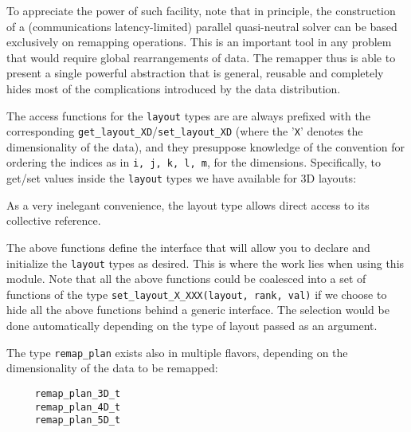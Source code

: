 \documentclass[]{report}   %
\begin{document}
To appreciate the power of such facility, note that in principle, the construction of a (communications latency-limited) parallel quasi-neutral solver can be based exclusively on remapping operations. This is an important tool in any problem that would require global rearrangements of data. The remapper thus is able to present a single powerful abstraction that is general, reusable and completely hides most of the complications introduced by the data distribution. 

\begin{comment}
Each of these boxes is simply described by several pairs of limits:
\begin{verbatim}
[i_min, i_max], [j_min, j_max], [k_min, k_max], [l_min, l_max],
\end{verbatim}    
(and for a 5D case, also \verb+[m_min, m_max]+) that describe the indices of the $4D$ data contained in each processor.  
\end{comment}








The access functions for the \verb+layout+ types are are always prefixed with the corresponding \verb+get_layout_XD+/\verb+set_layout_XD+ (where the '\verb+X+' denotes the dimensionality of the data), and they presuppose knowledge of the convention for ordering the indices as in \verb+i, j, k, l, m+, for the dimensions. Specifically, to get/set values inside the \verb+layout+ types we have available for 3D layouts:

As a very inelegant convenience, the layout type allows direct access to its collective reference.     

The above functions define the interface that will allow you to declare and initialize the \verb+layout+ types as desired. This is where the work lies when using this module. Note that all the above functions could be coalesced into a set of functions of the type \verb+set_layout_X_XXX(layout, rank, val)+ if we choose to hide all the above functions behind a generic interface. The selection would be done automatically depending on the type of layout passed as an argument. 

The type \verb+remap_plan+ exists also in multiple flavors, depending on the dimensionality of the data to be remapped:

\begin{verbatim}
     remap_plan_3D_t
     remap_plan_4D_t
     remap_plan_5D_t
\end{verbatim}
\end{document}
